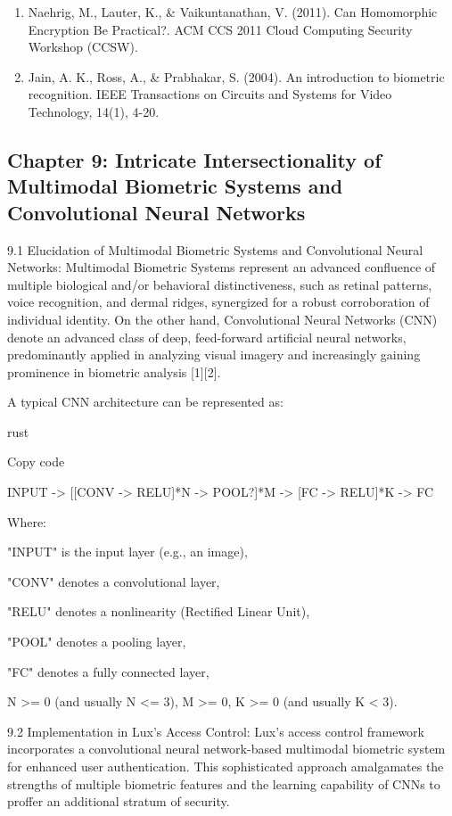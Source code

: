 \documentclass[11pt]{article}
\begin{document}
\begin{enumerate}
  \item Naehrig, M., Lauter, K., \& Vaikuntanathan, V. (2011). Can Homomorphic Encryption Be Practical?. ACM CCS 2011 Cloud Computing Security Workshop (CCSW).
  \item Jain, A. K., Ross, A., \& Prabhakar, S. (2004). An introduction to biometric recognition. IEEE Transactions on Circuits and Systems for Video Technology, 14(1), 4-20.
\end{enumerate}

\subsection{Chapter 9: Intricate Intersectionality of Multimodal Biometric Systems and Convolutional Neural Networks}

9.1 Elucidation of Multimodal Biometric Systems and Convolutional Neural Networks: Multimodal Biometric Systems represent an advanced confluence of multiple biological and/or behavioral distinctiveness, such as retinal patterns, voice recognition, and dermal ridges, synergized for a robust corroboration of individual identity. On the other hand, Convolutional Neural Networks (CNN) denote an advanced class of deep, feed-forward artificial neural networks, predominantly applied in analyzing visual imagery and increasingly gaining prominence in biometric analysis [1][2].


A typical CNN architecture can be represented as:


rust


Copy code


INPUT -> [[CONV -> RELU]*N -> POOL?]*M -> [FC -> RELU]*K -> FC


Where:


"INPUT" is the input layer (e.g., an image),


"CONV" denotes a convolutional layer,


"RELU" denotes a nonlinearity (Rectified Linear Unit),


"POOL" denotes a pooling layer,


"FC" denotes a fully connected layer,


N >= 0 (and usually N <= 3), M >= 0, K >= 0 (and usually K < 3).


9.2 Implementation in Lux's Access Control: Lux's access control framework incorporates a convolutional neural network-based multimodal biometric system for enhanced user authentication. This sophisticated approach amalgamates the strengths of multiple biometric features and the learning capability of CNNs to proffer an additional stratum of security.
\end{document}
